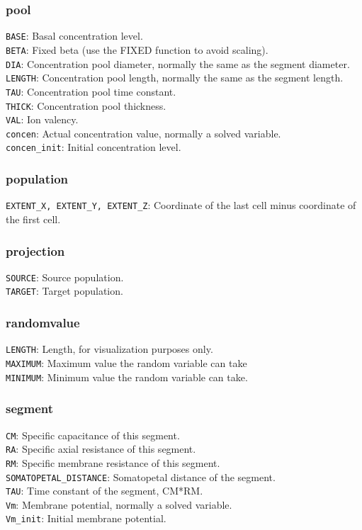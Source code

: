 \documentclass[12pt]{article}
\begin{document}
\subsubsection{pool}
{\tt BASE}: Basal concentration level.\\
{\tt BETA}: Fixed beta (use the FIXED function to avoid scaling).\\
{\tt DIA}: Concentration pool diameter, normally the same as the segment diameter.\\
{\tt LENGTH}: Concentration pool length, normally the same as the segment length.\\
{\tt TAU}: Concentration pool time constant.\\
{\tt THICK}: Concentration pool thickness.\\
{\tt VAL}: Ion valency.\\
{\tt concen}: Actual concentration value, normally a solved variable.\\
{\tt concen\_init}: Initial concentration level.
\subsubsection{population}
{\tt EXTENT\_X, EXTENT\_Y, EXTENT\_Z}: Coordinate of the last cell minus coordinate of the first cell.
\subsubsection{projection}
{\tt SOURCE}: Source population.\\
{\tt TARGET}: Target population.
\subsubsection{randomvalue}
{\tt LENGTH}: Length, for visualization purposes only.\\
{\tt MAXIMUM}: Maximum value the random variable can take\\
{\tt MINIMUM}: Minimum value the random variable can take.
\subsubsection{segment}
{\tt CM}: Specific capacitance of this segment.\\
{\tt RA}: Specific axial resistance of this segment.\\
{\tt RM}: Specific membrane resistance of this segment.\\
{\tt SOMATOPETAL\_DISTANCE}: Somatopetal distance of the segment.\\
{\tt TAU}: Time constant of the segment, CM*RM.\\
{\tt Vm}: Membrane potential, normally a solved variable.\\
{\tt Vm\_init}: Initial membrane potential.
\end{document}
